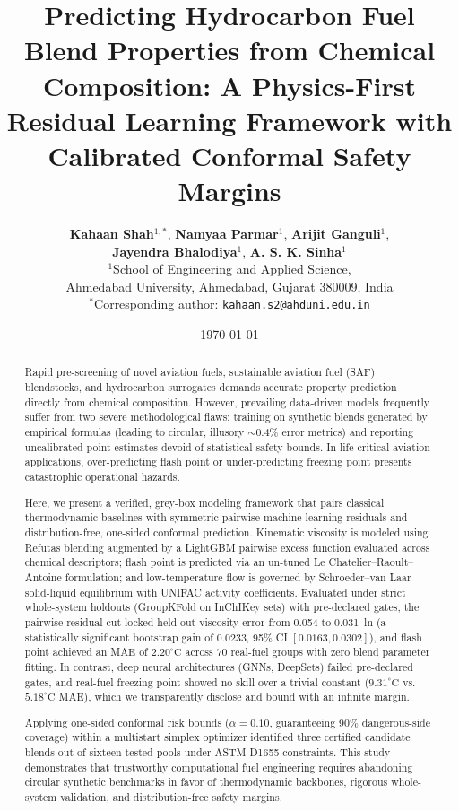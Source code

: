 \documentclass[11pt,a4paper]{article}
\title{\textbf{Predicting Hydrocarbon Fuel Blend Properties from Chemical Composition: A Physics-First Residual Learning Framework with Calibrated Conformal Safety Margins}}
\author{
    \textbf{Kahaan Shah}$^{1,*}$, 
    \textbf{Namyaa Parmar}$^{1}$, 
    \textbf{Arijit Ganguli}$^{1}$,\\
    \textbf{Jayendra Bhalodiya}$^{1}$, 
    \textbf{A. S. K. Sinha}$^{1}$\\[0.5em]
    $^{1}$School of Engineering and Applied Science,\\
    Ahmedabad University, Ahmedabad, Gujarat 380009, India\\[0.3em]
    $^*$Corresponding author: \texttt{kahaan.s2@ahduni.edu.in}
}
\date{\today}
\begin{document}
\maketitle

\begin{abstract}
Rapid pre-screening of novel aviation fuels, sustainable aviation fuel (SAF) blendstocks, and hydrocarbon surrogates demands accurate property prediction directly from chemical composition. However, prevailing data-driven models frequently suffer from two severe methodological flaws: training on synthetic blends generated by empirical formulas (leading to circular, illusory $\sim 0.4\%$ error metrics) and reporting uncalibrated point estimates devoid of statistical safety bounds. In life-critical aviation applications, over-predicting flash point or under-predicting freezing point presents catastrophic operational hazards. 

Here, we present a verified, grey-box modeling framework that pairs classical thermodynamic baselines with symmetric pairwise machine learning residuals and distribution-free, one-sided conformal prediction. Kinematic viscosity is modeled using Refutas blending augmented by a LightGBM pairwise excess function evaluated across chemical descriptors; flash point is predicted via an un-tuned Le Chatelier--Raoult--Antoine formulation; and low-temperature flow is governed by Schroeder--van Laar solid-liquid equilibrium with UNIFAC activity coefficients. Evaluated under strict whole-system holdouts (GroupKFold on InChIKey sets) with pre-declared gates, the pairwise residual cut locked held-out viscosity error from 0.054 to 0.031~ln (a statistically significant bootstrap gain of 0.0233, 95\% CI $[0.0163, 0.0302]$), and flash point achieved an MAE of $2.20^\circ\text{C}$ across 70 real-fuel groups with zero blend parameter fitting. In contrast, deep neural architectures (GNNs, DeepSets) failed pre-declared gates, and real-fuel freezing point showed no skill over a trivial constant ($9.31^\circ\text{C}$ vs. $5.18^\circ\text{C}$ MAE), which we transparently disclose and bound with an infinite margin. 

Applying one-sided conformal risk bounds ($\alpha = 0.10$, guaranteeing 90\% dangerous-side coverage) within a multistart simplex optimizer identified three certified candidate blends out of sixteen tested pools under ASTM D1655 constraints. This study demonstrates that trustworthy computational fuel engineering requires abandoning circular synthetic benchmarks in favor of thermodynamic backbones, rigorous whole-system validation, and distribution-free safety margins.
\end{abstract}
\end{document}
